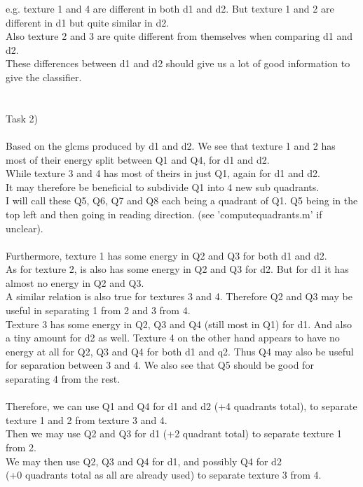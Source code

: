 \documentclass[12pt, letterpaper, twoside]{article}
\begin{document}
e.g. texture 1 and 4 are different in both d1 and d2. But texture 1 and 2 are different in d1 but quite similar in d2.\\
Also texture 2 and 3 are quite different from themselves when comparing d1 and d2.\\
These differences between d1 and d2 should give us a lot of good information to give the classifier.\\
\ \\
\ \\
Task 2)\\
\ \\
Based on the glcms produced by d1 and d2. We see that texture 1 and 2 has most of their energy split between Q1 and Q4, for d1 and d2.\\
While texture 3 and 4 has most of theirs in just Q1, again for d1 and d2.\\
It may therefore be beneficial to subdivide Q1 into 4 new sub quadrants.\\
I will call these Q5, Q6, Q7 and Q8 each being a quadrant of Q1. Q5 being in the top left and then going in reading direction. (see 'computequadrants.m' if unclear).\\ 
\ \\
Furthermore, texture 1 has some energy in Q2 and Q3 for both d1 and d2.\\
As for texture 2, is also has some energy in Q2 and Q3 for d2. But for d1 it has almost no energy in Q2 and Q3.\\
A similar relation is also true for textures 3 and 4. Therefore Q2 and Q3 may be useful in separating 1 from 2 and 3 from 4.\\
Texture 3 has some energy in Q2, Q3 and Q4 (still most in Q1) for d1. And also a tiny amount for d2 as well. Texture 4 on the other hand appears to have no energy at all for Q2, Q3 and Q4 for both d1 and q2. Thus Q4 may also be useful for separation between 3 and 4. We also see that Q5 should be good for separating 4 from the rest.\\
\ \\
Therefore, we can use Q1 and Q4 for d1 and d2 (+4 quadrants total), to separate texture 1 and 2 from texture 3 and 4.\\
Then we may use Q2 and Q3 for d1 (+2 quadrant total) to separate texture 1 from 2.\\
We may then use Q2, Q3 and Q4 for d1, and possibly Q4 for d2\\
(+0 quadrants total as all are already used) to separate texture 3 from 4.\\
\end{document}
